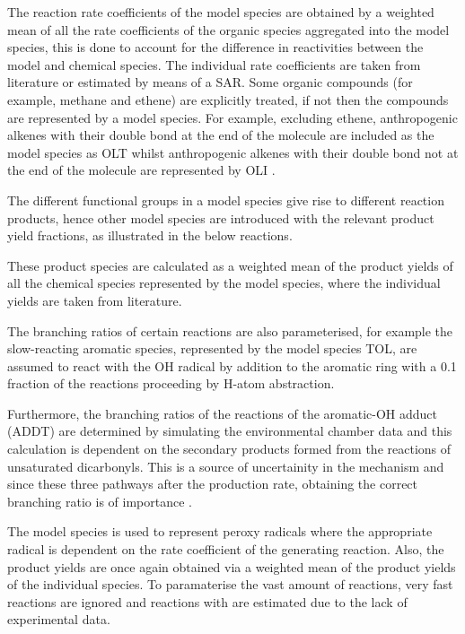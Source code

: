 The reaction rate coefficients of the model species are obtained by a weighted mean of all the rate coefficients of the organic species aggregated into the model species, this is done to account for the difference in reactivities between the model and chemical species. 
The individual rate coefficients are taken from literature or estimated by means of a SAR. 
Some organic compounds (for example, methane and ethene) are explicitly treated, if not then the compounds are represented by a model species. 
For example, excluding ethene, anthropogenic alkenes with their double bond at the end of the molecule are included as the model species as OLT whilst anthropogenic alkenes with their double bond not at the end of the molecule are represented by OLI \citep{Stockwell:1997}.

The different functional groups in a model species give rise to different reaction products, hence other model species are introduced with the relevant product yield fractions, as illustrated in the below reactions.
\begin{reactionlist}
\end{reactionlist}
These product species are calculated as a weighted mean of the product yields of all the chemical species represented by the model species, where the individual yields are taken from literature. 

The branching ratios of certain reactions are also parameterised, for example the slow-reacting aromatic species, represented by the model species TOL, are assumed to react with the OH radical by addition to the aromatic ring with a 0.1 fraction of the reactions proceeding by H-atom abstraction.
\begin{reactionlist}
\end{reactionlist}
Furthermore, the branching ratios of the reactions of the aromatic-OH adduct (ADDT) are determined by simulating the environmental chamber data and this calculation is dependent on the secondary products formed from the reactions of unsaturated dicarbonyls. 
This is a source of uncertainity in the mechanism and since these three pathways after the  production rate, obtaining the correct branching ratio is of importance \citep{Stockwell:1997}.

The model species  is used to represent peroxy radicals where the appropriate  radical is dependent on the rate coefficient of the generating reaction. 
Also, the product yields are once again obtained via a weighted mean of the product yields of the individual species. 
To paramaterise the vast amount of reactions, very fast reactions are ignored and reactions with  are estimated due to the lack of experimental data. 

